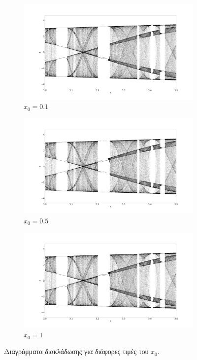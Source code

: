 \begin{figure}[ht]
	\centering
	
	\begin{subfigure}[b]{0.8\textwidth}
		\centering
		\includegraphics[width=\textwidth]{LateX images/sine q=-0.5/g2}
		\caption{$x_0=0.1$}
		\label{f:g54}
	\end{subfigure}
	\hfill
	\begin{subfigure}[b]{0.8\textwidth}
		\centering
		\includegraphics[width=\textwidth]{LateX images/sine q=-0.5/g14}
		\caption{$x_0=0.5$}
		\label{f:g55}
	\end{subfigure}
	\begin{subfigure}[b]{0.8\textwidth}
		\centering
		\includegraphics[width=\textwidth]{LateX images/sine q=-0.5/g15}
		\caption{$x_0=1$}
		\label{f:g56}
	\end{subfigure}
	
	\caption{Διαγράμματα διακλάδωσης για διάφορες τιμές του $x_0$. }
\end{figure}

